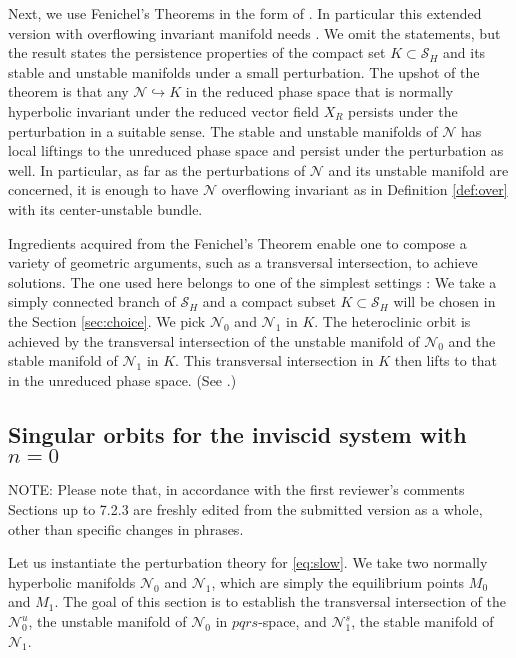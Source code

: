 \documentclass[a4paper,11pt]{article}
\def\red{\color{red}}
\def\blue{\color{blue}}
\theoremstyle{remark}
\begin{document}
Next, we use Fenichel's Theorems in the form of \cite[Theorem 2.2]{Sz1991}. In particular this extended version with overflowing invariant manifold needs \cite[Theorem 3]{fenichel_asymptotic_1977}. %
We omit the statements, but the result states the persistence properties of the {\blue compact set} $K\subset\mathcal{S}_H$ and its stable and unstable manifolds under a small perturbation. The upshot of the theorem is that any $\mathcal{N}\hookrightarrow K$ in the reduced phase space that is normally hyperbolic invariant under the reduced vector field $X_R$ persists under the perturbation in a suitable sense. The stable and unstable manifolds of $\mathcal{N}$ has local {\blue liftings} to the unreduced phase space and persist under the perturbation as well. In particular, as far as the perturbations of $\mathcal{N}$ and its unstable manifold are concerned, it is enough to have $\mathcal{N}$ overflowing invariant as in Definition \ref{def:over} with its center-unstable bundle.

Ingredients acquired from the Fenichel's Theorem enable one to compose a variety of geometric arguments, such as a transversal intersection, to achieve solutions. The one used here belongs to one of the simplest settings \cite[Theorem 3.1]{Sz1991}: We take a simply connected branch of  $\mathcal{S}_H$ and a compact subset {\blue $K\subset \mathcal{S}_H$ will be chosen in the Section \ref{sec:choice}}. We pick $\mathcal{N}_0$ and $\mathcal{N}_1$ in $K$. The heteroclinic orbit is achieved by the transversal intersection of the unstable manifold of $\mathcal{N}_0$ and the stable manifold of $\mathcal{N}_1$ in $K$. This transversal intersection in $K$ then lifts to that in the unreduced phase space. (See \cite{Sz1991}.) %


\subsection{Singular orbits for the inviscid system with $n=0$}\label{sec:singorb}
{\red NOTE: Please note that, in accordance with the first reviewer's comments Sections up to 7.2.3 are freshly edited from the submitted version as a whole, other than specific changes in phrases.}

Let us instantiate the perturbation theory for \eqref{eq:slow}. We take two normally hyperbolic manifolds %
$\mathcal{N}_0$ and $\mathcal{N}_1$, which are simply the equilibrium points $M_0$ and $M_1$. The goal of this section is to establish the transversal intersection of the $\mathcal{N}_0^u$, the unstable manifold of $\mathcal{N}_0$ {\blue in $pqrs$-space}, and $\mathcal{N}^s_1$, the stable manifold of $\mathcal{N}_1$.  
\end{document}
